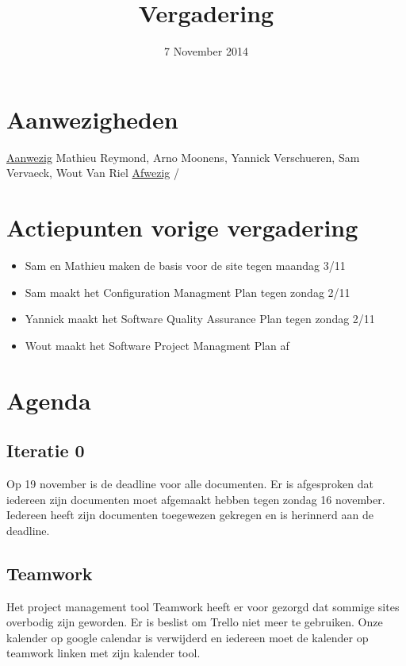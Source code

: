 \title{Vergadering}
\author{}
\date{7 November 2014}



\maketitle

\section{Aanwezigheden}
\underline{Aanwezig}  \newline
Mathieu Reymond, Arno Moonens, Yannick Verschueren, Sam Vervaeck, Wout Van Riel
\newline
\underline{Afwezig} \newline
/

\section{Actiepunten vorige vergadering}
\begin{itemize}
\item Sam en Mathieu maken de basis voor de site tegen maandag 3/11
\item Sam maakt het Configuration Managment Plan tegen zondag 2/11
\item Yannick maakt het Software Quality Assurance Plan tegen zondag 2/11
\item Wout maakt het Software Project Managment Plan af
\end{itemize}

\section{Agenda}
\subsection{Iteratie 0}
Op 19 november is de deadline voor alle documenten. Er is afgesproken dat iedereen zijn documenten moet afgemaakt hebben tegen zondag 16 november. Iedereen heeft zijn documenten toegewezen gekregen en is herinnerd aan de deadline.

\subsection{Teamwork}
Het project management tool Teamwork heeft er voor gezorgd dat sommige sites overbodig zijn geworden. Er is beslist om Trello niet meer te gebruiken. Onze kalender op google calendar is verwijderd en iedereen moet de kalender op teamwork linken met zijn kalender tool.

